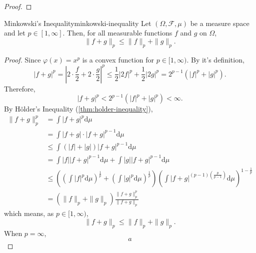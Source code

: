 \begin{proof}
    
\end{proof}

\begin{theorem}{Minkowski's Inequality}{minkowski-inequality}
    Let $(\Omega,\mathcal{F},\mu)$ be a measure space and let $p\in[1,\infty]$. Then, for all measurable functions $f$ and $g$ on $\Omega$,
    \begin{equation}
        \|f+g\|_{p} \leq\|f\|_{p}+\|g\|_{p}.
    \end{equation}
\end{theorem}

\begin{proof}
    Since $\varphi(x)=x^p$ is a convex function for $p\in[1,\infty)$. By it's definition,
    \begin{equation*}
        |f+g|^{p}=\left|2\cdot\frac{f}{2}+2\cdot\frac{g}{2}\right|^{p}\leq \frac{1}{2}|2f|^p+\frac{1}{2}|2g|^p=2^{p-1}\left(|f|^{p}+|g|^{p}\right).
    \end{equation*}
    Therefore,
    \begin{equation*}
        |f+g|^{p}<2^{p-1}\left(|f|^{p}+|g|^{p}\right)<\infty.
    \end{equation*}
    By H\"older's Inequality (\ref{thm:holder-inequality}),
    \begin{equation*}
        \begin{aligned}
            \|f+g\|_{p}^{p} &=\int|f+g|^{p}\mathrm{d}\mu \\
            &=\int|f+g| \cdot|f+g|^{p-1}\mathrm{d} \mu \\
            &\leq \int(|f|+|g|)|f+g|^{p-1}\mathrm{d}\mu \\
            &=\int|f||f+g|^{p-1}\mathrm{d}\mu+\int|g||f+g|^{p-1}\mathrm{d}\mu \\
            & \leq\left(\left(\int|f|^{p} \mathrm{d} \mu\right)^{\frac{1}{p}}+\left(\int|g|^{p} \mathrm{d} \mu\right)^{\frac{1}{p}}\right)\left(\int|f+g|^{(p-1)\left(\frac{p}{p-1}\right)} \mathrm{d} \mu\right)^{1-\frac{1}{p}} \\
            &=\left(\|f\|_{p}+\|g\|_{p}\right) \frac{\|f+g\|_{p}^{p}}{\|f+g\|_{p}}
        \end{aligned}
    \end{equation*}
    which means, as $p\in[1,\infty)$,
    \begin{equation*}
        \|f+g\|_{p} \leq\|f\|_{p}+\|g\|_{p}.
    \end{equation*}
    When $p=\infty$,
    \begin{equation*}
        a
    \end{equation*}
\end{proof}

